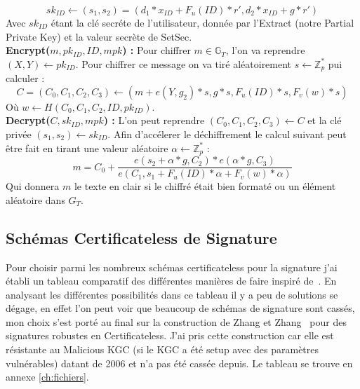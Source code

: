 \[sk_{ID} \leftarrow (s_1, s_2) = (d_1*x_{ID} + F_u(ID)*r', d_2*x_{ID} + g*r')\]
Avec $sk_{ID}$ étant la clé secréte de l'utilisateur, donnée par l'Extract (notre Partial Private Key) et la valeur secrète de SetSec.\\
\textbf{Encrypt($m, pk_{ID}, ID, mpk$) :} Pour chiffrer $m \in \mathbb{G}_T$, l'on va reprendre $(X,Y) \leftarrow pk_{ID}$. Pour chiffrer ce message on va tiré aléatoirement $s \leftarrow \mathbb{Z}_p^*$ pui calculer : 
\[C = (C_0, C_1, C_2, C_3) \leftarrow (m + e(Y, g_2)*s, g*s,F_u(ID)*s, F_v(w)*s )\]
Où $w \leftarrow H(C_0,C_1, C_2, ID, pk_{ID})$.\\
\textbf{Decrypt($C, sk_{ID}, mpk$) :} L'on peut reprendre $(C_0,C_1,C_2,C_3) \leftarrow C$ et la clé privée $(s_1, s_2) \leftarrow sk_{ID}$. Afin d'accélerer le déchiffrement le calcul suivant peut être fait en tirant une valeur aléatoire $\alpha \leftarrow \mathbb{Z}_p^*$ :
\[m = C_0 + \frac{e(s_2 + \alpha*g, C_2 )*e(\alpha*g, C_3)}{e(C_1, s_1 + F_u(ID)*\alpha + F_v(w)*\alpha)}\]
Qui donnera $m$ le texte en clair si le chiffré était bien formaté ou un élément aléatoire dans $G_T$.
\subsection{Schémas Certificateless de Signature}
Pour choisir parmi les nombreux schémas certificateless pour la signature j'ai établi un tableau comparatif des différentes manières de faire inspiré de~\cite{bookIntroCertificateless}. En analysant les différentes possibilités dans ce tableau il y a peu de solutions se dégage, en effet l'on peut voir que beaucoup de schémas de signature sont cassés, mon choix s'est porté au final sur la construction de Zhang et Zhang~\cite{DBLP:conf/acns/ZhangWXF06} pour des signatures robustes en Certificateless. J'ai pris cette construction car elle est résistante au Malicious KGC (si le KGC a été setup avec des paramètres vulnérables) datant de 2006 et n'a pas été cassée depuis. Le tableau se trouve en annexe \ref{ch:fichiers}.
